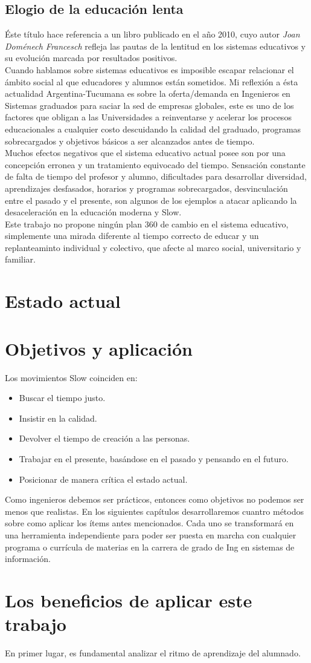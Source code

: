 \subsection{Elogio de la educaci\'on lenta}
\'Este t\'itulo hace referencia a un libro publicado en el a\~no 2010, cuyo autor \textit{Joan Dom\'enech Francesch} refleja las pautas de la lentitud en los 
sistemas educativos y su evoluci\'on marcada por resultados positivos.\\
Cuando hablamos sobre sistemas educativos es imposible escapar relacionar el \'ambito social al que educadores y alumnos est\'an sometidos. Mi reflexi\'on a 
\'esta actualidad Argentina-Tucumana es sobre la oferta/demanda en Ingenieros en Sistemas graduados para saciar la sed de empresas globales, este es uno de los factores
que obligan a las Universidades a reinventarse y acelerar los procesos educacionales a cualquier costo descuidando la calidad del graduado, programas sobrecargados
y objetivos b\'asicos a ser alcanzados antes de tiempo.\\
Muchos efectos negativos que el sistema educativo actual posee son por una concepci\'on erronea y un tratamiento equivocado del tiempo. Sensaci\'on constante
de falta de tiempo del profesor y alumno, dificultades para desarrollar diversidad, aprendizajes desfasados, horarios y programas sobrecargados, desvinculaci\'on
entre el pasado y el presente, son algunos de los ejemplos a atacar aplicando la desaceleraci\'on en la educaci\'on moderna y Slow.\\

Este trabajo no propone ning\'un plan 360 de cambio en el sistema educativo, simplemente una mirada diferente al tiempo correcto de educar y un replanteaminto 
individual y colectivo, que afecte al marco social, universitario y familiar.

\section{Estado actual}\label{ch1:opts}
\section{Objetivos y aplicaci\'on}
Los movimientos Slow coinciden en:
\begin{itemize}
 \item Buscar el tiempo justo.
 \item Insistir en la calidad.
 \item Devolver el tiempo de creaci\'on a las personas.
 \item Trabajar en el presente, bas\'andose en el pasado y pensando en el futuro.
 \item Posicionar de manera cr\'itica el estado actual.
\end{itemize}
Como ingenieros debemos ser pr\'acticos, entonces como objetivos no podemos ser menos que realistas. En los siguientes cap\'itulos desarrollaremos cuantro m\'etodos
sobre como aplicar los \'items antes mencionados. Cada uno se transformar\'a en una herramienta independiente para poder ser puesta en marcha con cualquier 
programa o curr\'icula de materias en la carrera de grado de Ing en sistemas de informaci\'on.\\


\section{Los beneficios de aplicar este trabajo}
En primer lugar, es fundamental analizar el ritmo de aprendizaje del alumnado.
